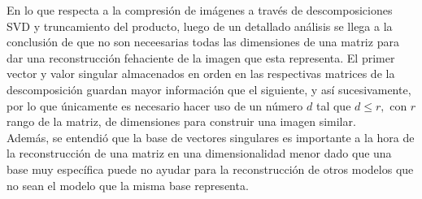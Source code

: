 \documentclass[12pt,a4]{article} %
\begin{document}
En lo que respecta a la compresión de imágenes a través de descomposiciones SVD y truncamiento del producto, luego de un detallado análisis se llega a la conclusión de que no son neceesarias todas las dimensiones de una matriz para dar una reconstrucción fehaciente de la imagen que esta representa. El primer vector y valor singular almacenados en orden en las respectivas matrices de la descomposición guardan mayor información que el siguiente, y así sucesivamente, por lo que únicamente es necesario hacer uso de un número $d$ tal que $d \leq r,$ con $r$ rango de la matriz, de dimensiones para construir una imagen similar.
\\

Además, se entendió que la base de vectores singulares es importante a la hora de la reconstrucción de una matriz en una dimensionalidad menor dado que una base muy específica puede no ayudar para la reconstrucción de otros modelos que no sean el modelo que la misma base representa.

\appendix




\printbibliography
\end{document}
